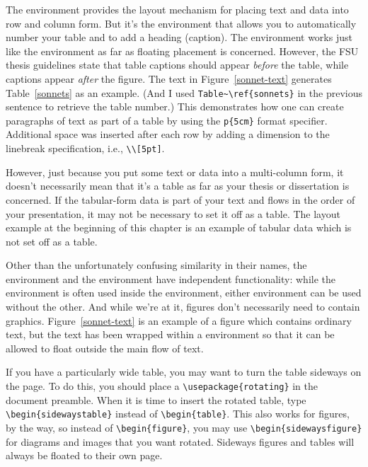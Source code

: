 The  environment provides the layout mechanism for
placing text and data into row and column form.  But it's the
 environment that allows you to automatically number your
table and to add a heading (caption).  The  environment
works just like the  environment as far as floating
placement is concerned.  However, the FSU thesis guidelines state that
table captions should appear \emph{before} the table, while
 captions appear \emph{after} the figure.  The text in
Figure~\ref{sonnet-text} generates Table~\ref{sonnets} as an example.
(And I used \verb|Table~\ref{sonnets}| in the previous sentence to
retrieve the table number.)  This demonstrates how one can create
paragraphs of text as part of a table by using the \verb|p{5cm}|
format specifier.  Additional space was inserted after each row by
adding a dimension to the linebreak specification, i.e., \verb|\\[5pt]|.

However, just because you put some text or data into a multi-column
form, it doesn't necessarily mean that it's a table as far as your
thesis or dissertation is concerned.  If the tabular-form data is part
of your text and flows in the order of your presentation, it may not
be necessary to set it off as a table.  The layout example at the
beginning of this chapter is an example of tabular data which is not
set off as a table.

Other than the unfortunately confusing similarity in their names, the
 environment and the  environment have
independent functionality: while the  environment is
often used inside the  environment, either environment can
be used without the other.  And while we're at it, figures don't
necessarily need to contain graphics.  Figure~\ref{sonnet-text} is an
example of a figure which contains ordinary text, but the text has
been wrapped within a  environment so that it can be
allowed to float outside the main flow of text.

If you have a particularly wide table, you may want to turn the table
sideways on the page.  To do this, you should place a
\verb|\usepackage{rotating}| in the document preamble.  When it is
time to insert the rotated table, type \verb|\begin{sidewaystable}|
instead of \verb|\begin{table}|.  This also works for figures, by the
way, so instead of \verb|\begin{figure}|, you may use
\verb|\begin{sidewaysfigure}| for diagrams and images that you want
rotated.  Sideways figures and tables will always be floated to their
own page.

